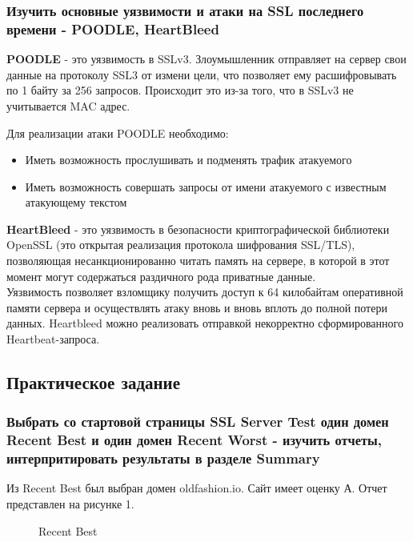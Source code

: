 \documentclass[10pt,a4paper,titlepage]{article}
\begin{document}
\subsubsection{Изучить основные уязвимости и атаки на SSL последнего времени - POODLE, HeartBleed}
\textbf{POODLE} - это уязвимость в SSLv3. Злоумышленник отправляет на сервер свои данные на протоколу SSL3 от измени цели, что позволяет ему расшифровывать по 1 байту за 256 запросов. Происходит это из-за того, что в SSLv3 не учитывается MAC адрес.

Для реализации атаки POODLE необходимо: 
\begin{itemize}
\item Иметь возможность прослушивать и подменять трафик атакуемого
\item Иметь возможность совершать запросы от имени атакуемого с известным атакующему текстом
\end{itemize}

\textbf{HeartBleed} - это уязвимость в безопасности криптографической библиотеки OpenSSL (это открытая реализация протокола шифрования SSL/TLS), позволяющая несанкционированно читать память на сервере, в которой в этот момент могут содержаться раздичного рода приватные данные. \\
Уязвимость позволяет взломщику получить доступ к 64 килобайтам оперативной памяти сервера и осуществлять атаку вновь и вновь вплоть до полной потери данных. Heartbleed можно реализовать отправкой некорректно сформированного Heartbeat-запроса.

\subsection{Практическое задание}
\subsubsection{Выбрать со стартовой страницы SSL Server Test один домен Recent Best и один домен Recent Worst - изучить отчеты, интерпритировать результаты в разделе Summary}
Из Recent Best был выбран домен oldfashion.io. Сайт имеет оценку А. Отчет представлен на рисунке 1.

\begin{figure}[!h]	
\caption{Recent Best}
\label{ris:image1}
\end{figure}
\end{document}
